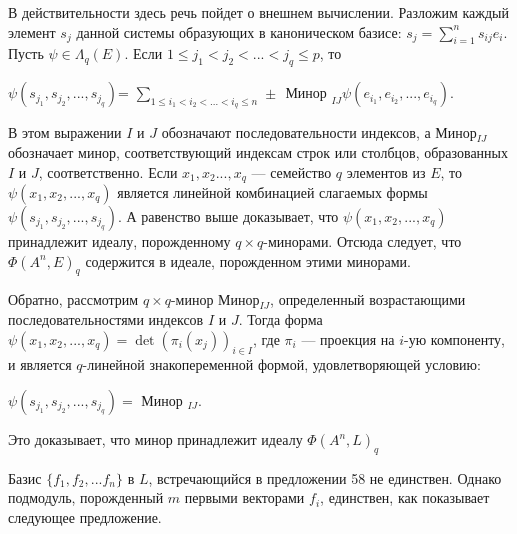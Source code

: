 \begin{myproof}
В действительности здесь речь пойдет о внешнем вычислении. Разложим каждый элемент $s_j$ данной системы образующих в каноническом базисе: $s_j = \sum^{n}_{i=1} s_{ij} e_i$. Пусть $\psi \in \Lambda _q (E)$. Если $1 \leqslant j_1 < j_2 < ... < j_q \leqslant p$, то 
\begin{center} $\psi (s_{j_1}, s_{j_2}, ..., s_{j_q}) $= $\sum_{1 \leqslant i_1 < i_2 < ... < i_q \leqslant n}$ $ \pm $ $ \text{ Минор }_{IJ} \psi (e_{i_1}, e_{i_2},..., e_{i_q}). $\end{center} 

\noindent В этом выражении $I$ и $J$ обозначают последовательности индексов, а Минор$_{IJ}$ обозначает минор, соответствующий индексам строк или столбцов, образованных $I$ и $J$, соответственно. Если $x_1, x_2 ..., x_q$ — семейство $q$ элементов из $E$, то $ \psi (x_1, x_2, ..., x_q)$ является линейной комбинацией слагаемых формы $\psi (s_{j_1}, s_{j_2},..., s_{j_q})$. А равенство выше доказывает, что $ \psi (x_1, x_2, ..., x_q)$ принадлежит идеалу, порожденному $q \times q$-минорами. Отсюда следует, что $\Phi(A^{n}, E)_q$ содержится в идеале, порожденном этими минорами.

\noindent Обратно, рассмотрим $q \times q$-минор Минор$_{IJ}$, определенный возрастающими последовательностями индексов $I$ и $J$. Тогда форма $ \psi (x_1, x_2, ..., x_q) = \det(\pi _i (x_j))_{i \in I}$, где $\pi _i$ — проекция на $i$-ую компоненту, и является $q$-линейной знакопеременной формой, удовлетворяющей условию:
\begin{center} $ \psi (s_{j_1}, s_{j_2},..., s_{j_q})=$ Минор $_{IJ}.$\end{center}

\noindent Это доказывает, что минор принадлежит идеалу $\Phi(A^{n}, L)_q$
\end{myproof}
\noindent Базис $\{f_1, f_2,...f_n\}$ в $L$, встречающийся в предложении 58 не единствен. Однако подмодуль, порожденный $m$ первыми векторами $f_i$, единствен, как показывает следующее предложение.
